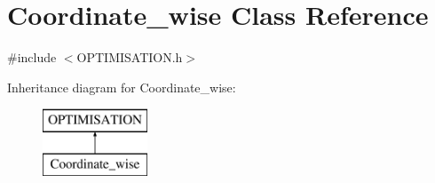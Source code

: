 \hypertarget{class_coordinate__wise}{}\section{Coordinate\+\_\+wise Class Reference}
\label{class_coordinate__wise}


{\ttfamily \#include $<$O\+P\+T\+I\+M\+I\+S\+A\+T\+I\+O\+N.\+h$>$}

Inheritance diagram for Coordinate\+\_\+wise\+:\begin{figure}[H]
\begin{center}
\leavevmode
\includegraphics[height=2.000000cm]{class_coordinate__wise}
\end{center}
\end{figure}
